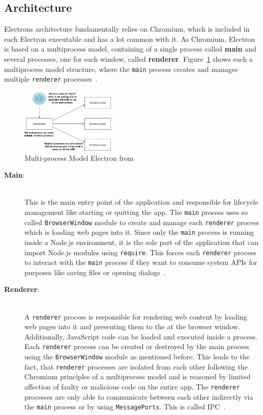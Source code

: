 \subsection{Architecture}
\label{subsec:electron:architecture}
Electrons architecture fundamentally relies on Chromium, which is included in each Electron executable and has a lot common with it.
As Chromium, Electron is based on a multiprocess model, containing of a single process called \textbf{main} and several processes, one for each window, called \textbf{renderer}.
Figure~\ref{fig:electron:model} shows such a multiprocess model structure, where the \texttt{main} process creates and manages multiple \texttt{renderer} processes~\cite{electron-in-action}.
\begin{figure}[ht]
    \centering
    \includegraphics[width=0.4\textwidth]{images/electron-model}
    \caption[Bla]{Multi-process Model Electron from~\cite[Fig. 1.7]{electron-in-action}}
    \label{fig:electron:model}
\end{figure}
\begin{description}
    \item[\textbf{Main}:] \hfill \\ This is the main entry point of the application and responsible for lifecycle management like starting or quitting the app.
    The \texttt{main} process uses so called \texttt{BrowserWindow} module to create and manage each \texttt{renderer} process which is loading web pages into it.
    Since only the \texttt{main} process is running inside a Node.js environment, it is the sole part of the application that can import Node.js modules using \texttt{require}.
    This forces each \texttt{renderer} process to interact with the \texttt{main} process if they want to consume system \ac{API}s for purposes like saving files or opening dialogs~\cite{ElectronDoc,electron-in-action}.

    \item[\textbf{Renderer}:] \hfill \\ A \texttt{renderer} process is responsible for rendering web content by loading web pages into it and presenting them to the at the browser window.
    Additionally, JavaScript code can be loaded and executed inside a process.
    Each \texttt{renderer} process can be created or destroyed by the main process using the \texttt{BrowserWindow} module as mentioned before.
    This leads to the fact, that \texttt{renderer} processes are isolated from each other following the Chromium principles of a multiprocess model and is reasoned by limited affection of
    faulty or malicious code on the entire app.
    The \texttt{renderer} processes are only able to communicate between each other indirectly via the \texttt{main} process or by using \texttt{MessagePorts}.
    This is called \ac{IPC}~\cite{ElectronDoc,electron-in-action}.
\end{description}

